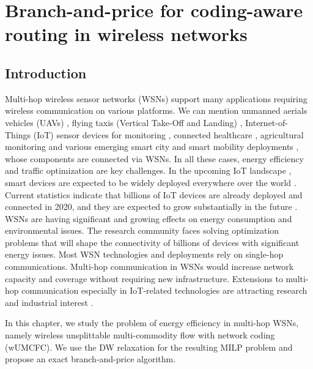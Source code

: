 
\chapter{Branch-and-price for coding-aware routing in wireless networks}
\label{chap.bp}


\section{Introduction}
 \raggedbottom
 
Multi-hop wireless sensor networks (WSNs) support many applications requiring wireless communication on various platforms. We can mention unmanned aerials vehicles (UAVs) \cite{ mozaffari2019tutorial, oubbati2019routing}, flying taxis (Vertical Take-Off and Landing) \cite{pelegrin:hal-02902566}, Internet-of-Things (IoT) sensor devices for monitoring \cite{deebak2020hybrid,wu2019internet}, connected healthcare \cite{gope2015bsn, IoTHealthCare2017}, agricultural monitoring and various emerging smart city and smart mobility deployments \cite{lu2017collaborative,yaqoob2017enabling}, whose components are connected via WSNs. In all these cases, energy efficiency and traffic optimization are key challenges. In the upcoming IoT landscape \cite{akpakwu2017survey, rahimi2018novel}, smart devices are expected to be widely deployed everywhere over the world \cite{fysarakis2016iot}. Current statistics indicate that billions of IoT devices are already deployed and connected in 2020, and they are expected to grow substantially in the future \cite{almeida2020proposal}. 
WSNs are having significant and growing effects on energy consumption and environmental issues. The research community faces solving optimization problems that will shape the connectivity of billions of devices with significant energy issues. 
Most WSN technologies and deployments rely on single-hop communications. Multi-hop communication in WSNs would increase network capacity and coverage without requiring new infrastructure. Extensions to multi-hop communication especially in IoT-related technologies are attracting research and industrial interest \cite{gomez2006adapting,shaikh2018routing}. 

In this chapter, we study the problem of energy efficiency in multi-hop WSNs, namely wireless unsplittable multi-commodity flow with network coding (wUMCFC). We use the DW relaxation for the resulting MILP problem and propose an exact branch-and-price algorithm.

